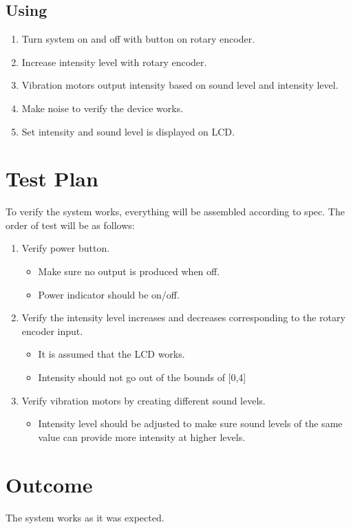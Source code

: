 \documentclass{article}
\begin{document}
\subsection{Using}
\begin{enumerate}
    \item Turn system on and off with button on rotary encoder.
    \item Increase intensity level with rotary encoder.
    \item Vibration motors output intensity based on sound level and intensity level.
    \item Make noise to verify the device works.
    \item Set intensity and sound level is displayed on LCD.
\end{enumerate}

\section{Test Plan}
    To verify the system works, everything will be assembled according to spec.  The order of test will be as follows:
    \begin{enumerate}
    \item Verify power button.
        \begin{itemize}
            \item Make sure no output is produced when off.
            \item Power indicator should be on/off.
        \end{itemize}
    \item Verify the intensity level increases and decreases corresponding to the rotary encoder input.
        \begin{itemize}
            \item It is assumed that the LCD works.
            \item Intensity should not go out of the bounds of [0,4]
        \end{itemize}
    \item Verify vibration motors by creating different sound levels.
        \begin{itemize}
            \item Intensity level should be adjusted to make sure sound levels of the same value can provide more intensity at higher levels.
        \end{itemize}
    \end{enumerate}
\section{Outcome}
The system works as it was expected.
\end{document}
